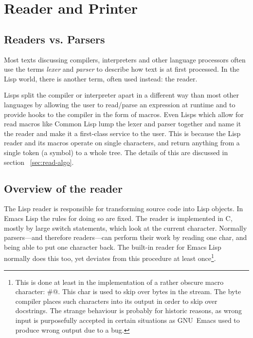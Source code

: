 \documentclass[a4paper,10pt,twoside]{report}
\newcommand{\el}{Emacs Lisp}
\newcommand{\cl}{Common Lisp}
\newcommand{\emacs}{GNU~Emacs}
\begin{document}
\chapter{Reader and Printer}
\label{chapter:reader-printer}

\section{Readers vs. Parsers}
\label{subsec:readers-vs-parsers}

Most texts discussing compilers, interpreters and other language processors
often use the terms \emph{lexer} and \emph{parser} to describe how text is at
first processed.  In the Lisp world, there is another term, often used instead:
the reader.

Lisps split the compiler or interpreter apart in a different way than most other
languages by allowing the user to read/parse an expression at runtime and to
provide hooks to the compiler in the form of macros.  Even Lisps which allow for
read macros like \cl{} lump the lexer and parser together and name it the reader
and make it a first-class service to the user.  This is because the Lisp reader
and its macros operate on single characters, and return anything from a single
token (a symbol) to a whole tree.  The details of this are discussed in section
~\ref{sec:read-algo}.

\section{Overview of the reader}
\label{subsec:reader}

The Lisp reader is responsible for transforming source code into Lisp objects.
In \el{} the rules for doing so are fixed.  The reader is implemented in C,
mostly by large switch statements, which look at the current character.
Normally parsers---and therefore readers---can perform their work by reading one
char, and being able to put one character back.  The built-in reader for \el{}
normally does this too, yet deviates from this procedure at least
once\footnote{This is done at least in the implementation of a rather obscure
  macro character: \#@.  This char is used to skip over bytes in the stream.
  The byte compiler places such characters into its output in order to skip over
  docstrings.  The strange behaviour is probably for historic reasons, as wrong
  input is purposefully accepted in certain situations as \emacs{} used to
  produce wrong output due to a bug.}.
\end{document}
